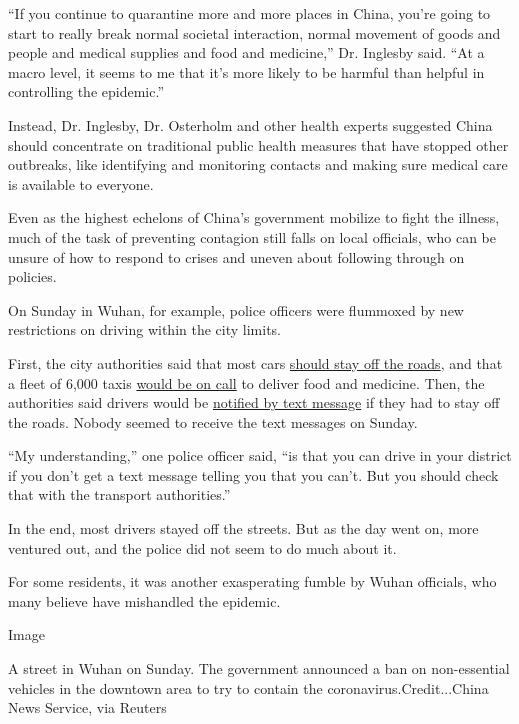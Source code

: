 ``If you continue to quarantine more and more places in China, you're
going to start to really break normal societal interaction, normal
movement of goods and people and medical supplies and food and
medicine,'' Dr. Inglesby said. ``At a macro level, it seems to me that
it's more likely to be harmful than helpful in controlling the
epidemic.''

Instead, Dr. Inglesby, Dr. Osterholm and other health experts suggested
China should concentrate on traditional public health measures that have
stopped other outbreaks, like identifying and monitoring contacts and
making sure medical care is available to everyone.

Even as the highest echelons of China's government mobilize to fight the
illness, much of the task of preventing contagion still falls on local
officials, who can be unsure of how to respond to crises and uneven
about following through on policies.

On Sunday in Wuhan, for example, police officers were flummoxed by new
restrictions on driving within the city limits.

First, the city authorities said that most cars
\href{https://mp.weixin.qq.com/s?src=11\&timestamp=1580035588\&ver=2120\&signature=SxuKbIMYjrZ4tw2dH2Sf-41vvxx9SlwFgJfynxcr6wjvcfvE4FyGoNh50zGorYJ7JeaFWmsNZELIGwOekOTIi98jPNkDdjwEKebM*JE3TAIdS17Ax5-oi0gQ14Fa6mYW\&new=1}{should
stay off the roads}, and that a fleet of 6,000 taxis
\href{http://www.chinanews.com/gn/2020/01-26/9069778.shtml}{would be on
call} to deliver food and medicine. Then, the authorities said drivers
would be
\href{https://baijiahao.baidu.com/s?id=1656737257191494058\&wfr=spider\&for=pc}{notified
by text message} if they had to stay off the roads. Nobody seemed to
receive the text messages on Sunday.

``My understanding,'' one police officer said, ``is that you can drive
in your district if you don't get a text message telling you that you
can't. But you should check that with the transport authorities.''

In the end, most drivers stayed off the streets. But as the day went on,
more ventured out, and the police did not seem to do much about it.

For some residents, it was another exasperating fumble by Wuhan
officials, who many believe have mishandled the epidemic.

Image

A street in Wuhan on Sunday. The government announced a ban on
non-essential vehicles in the downtown area to try to contain the
coronavirus.Credit...China News Service, via Reuters

